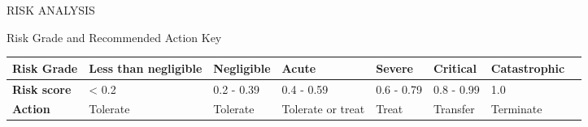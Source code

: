 \documentclass{article}
\begin{document}
\begin{section}{RISK ANALYSIS}
		\begin{subsection}{Risk Grade and Recommended Action Key}
			\begin{tabularx}{\linewidth}{| X | X | X | X | X | X | X | X |}
				\hline
				\bf{Risk Grade} & Less than negligible & Negligible & Acute & Severe & Critical & Catastrophic \\
				\hline
				\bf{Risk score} & \cellcolor{green} < 0.2 & \cellcolor{negligible} 0.2 - 0.39 & \cellcolor{acute} 0.4 - 0.59 & \cellcolor{severe} 0.6 - 0.79 & \cellcolor{critical} 0.8 - 0.99 & \cellcolor{red} 1.0 \\
				\hline
				\bf{Action} & Tolerate & Tolerate & Tolerate or treat & Treat & Transfer & Terminate \\
				\hline
			\end{tabularx}
		\end{subsection}
	\end{section}
	
\end{document}
